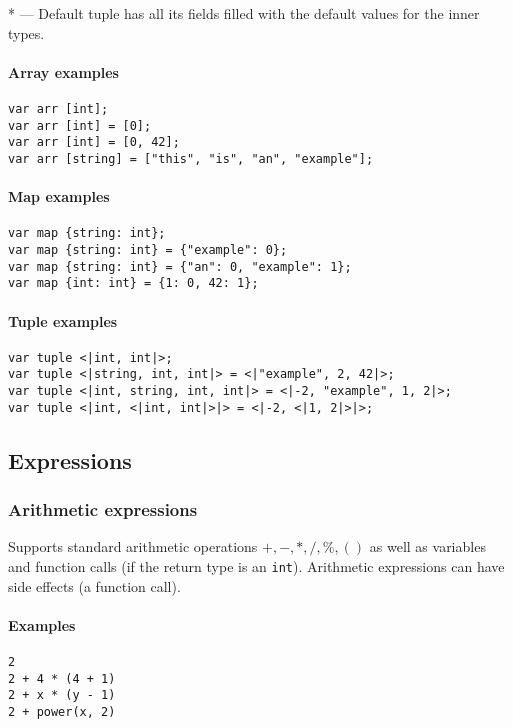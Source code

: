 \documentclass{article}
\begin{document}
* --- Default tuple has all its fields filled with the default values for the
inner types.

\paragraph{Array examples}
\texttt{var arr [int];} \\
\texttt{var arr [int] = [0];} \\
\texttt{var arr [int] = [0, 42];} \\
\texttt{var arr [string] = ["this", "is", "an", "example"];}

\paragraph{Map examples}
\texttt{var map \{string: int\}; }\\
\texttt{var map \{string: int\} = \{"example": 0\};} \\
\texttt{var map \{string: int\} = \{"an": 0, "example": 1\};} \\
\texttt{var map \{int: int\} = \{1: 0, 42: 1\};}

\paragraph{Tuple examples}
\texttt{var tuple <|int, int|>;} \\
\texttt{var tuple <|string, int, int|> = <|"example", 2, 42|>;} \\
\texttt{var tuple <|int, string, int, int|> = <|-2, "example", 1, 2|>;} \\
\texttt{var tuple <|int, <|int, int|>|> = <|-2, <|1, 2|>|>;}

\subsection{Expressions}

\subsubsection{Arithmetic expressions}
Supports standard arithmetic operations $+, -, *, /, \%, ()$ as well as
variables and function calls (if the return type is an \texttt{int}). Arithmetic
expressions can have side effects (a function call).

\paragraph{Examples}
\texttt{2} \\
\texttt{2 + 4 * (4 + 1)} \\
\texttt{2 + x * (y - 1)} \\
\texttt{2 + power(x, 2)}
\end{document}

